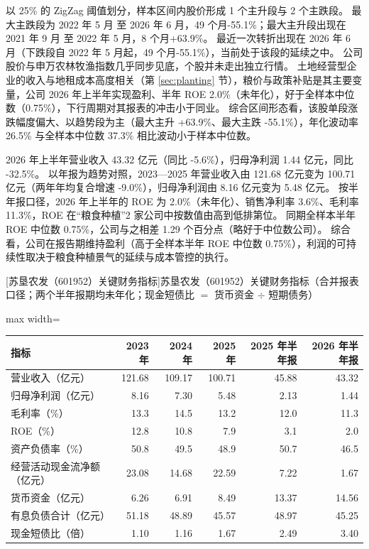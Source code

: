  以 25\% 的 ZigZag 阈值划分，样本区间内股价形成 1 个主升段与 2 个主跌段。 最大主跌段为 2022 年 5 月 至 2026 年 6 月，49 个月-55.1\%；最大主升段出现在 2021 年 9 月 至 2022 年 5 月，8 个月+63.9\%。 最近一次转折出现在 2026 年 6 月（下跌段自 2022 年 5 月起，49 个月-55.1\%），当前处于该段的延续之中。 公司股价与申万农林牧渔指数几乎同步见底，个股并未走出独立行情。 土地经营型企业的收入与地租成本高度相关（第 \ref{sec:planting} 节），粮价与政策补贴是其主要变量，公司 2026 年上半年实现盈利、半年 ROE 2.0\%（未年化），好于全样本中位数（0.75\%），下行周期对其报表的冲击小于同业。 综合区间形态看，该股单段涨跌幅度偏大、以趋势段为主（最大主升 +63.9\%、最大主跌 -55.1\%），年化波动率 26.5\% 与全样本中位数 37.3\% 相比波动小于样本中位数。

 2026 年上半年营业收入 43.32 亿元（同比 -5.6\%），归母净利润 1.44 亿元，同比 -32.5\%。 以年报为趋势对照，2023---2025 年营业收入由 121.68 亿元变为 100.71 亿元（两年年均复合增速 -9.0\%），归母净利润由 8.16 亿元变为 5.48 亿元。 按半年报口径，2026 年上半年的 ROE 为 2.0\%（未年化）、销售净利率 3.6\%、毛利率 11.3\%，ROE 在“粮食种植”2 家公司中按数值由高到低排第位。 同期全样本半年 ROE 中位数 0.75\%，公司与之相差 1.29 个百分点（略好于中位数公司）。 综合看，公司在报告期维持盈利（高于全样本半年 ROE 中位数 0.75\%），利润的可持续性取决于粮食种植景气的延续与成本管控的执行。

\begin{center}\small\setlength{\tabcolsep}{3.4pt}
[苏垦农发（601952）关键财务指标]{苏垦农发（601952）关键财务指标（合并报表口径；两个半年报期均未年化；现金短债比 $=$ 货币资金 $\div$ 短期债务）}
\begin{adjustbox}{max width=\textwidth}
\begin{tabular}{@{}lrrrrr@{}}
\toprule
指标 & 2023 年 & 2024 年 & 2025 年 & 2025 年半年报 & 2026 年半年报 \\
\midrule
营业收入（亿元） & 121.68 & 109.17 & 100.71 & 45.88 & 43.32 \\
归母净利润（亿元） & 8.16 & 7.30 & 5.48 & 2.13 & 1.44 \\
毛利率（\%） & 13.3 & 14.5 & 13.2 & 12.0 & 11.3 \\
ROE（\%） & 12.8 & 10.8 & 7.9 & 3.1 & 2.0 \\
资产负债率（\%） & 50.8 & 49.5 & 48.9 & 50.7 & 46.5 \\
经营活动现金流净额（亿元） & 23.08 & 14.68 & 22.59 & 7.22 & 1.67 \\
货币资金（亿元） & 6.26 & 6.91 & 8.49 & 13.37 & 14.56 \\
有息负债合计（亿元） & 51.18 & 48.89 & 45.57 & 48.97 & 45.25 \\
现金短债比（倍） & 1.10 & 1.16 & 1.67 & 2.49 & 3.40 \\
\bottomrule
\end{tabular}
\end{adjustbox}
\end{center}

